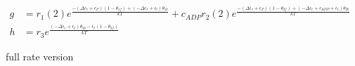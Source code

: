 \documentclass[11pt]{article}
\begin{document}
\begin{figure}[H]
\begin{align}
		g & = r_{1}(2) e^{\frac{ - \left( \Delta\epsilon_{r} + {\epsilon}_P \right) \left( 1 - \theta_{1f} \right) + \left(  - \Delta\epsilon_{r} + \epsilon_{t} \right) \theta_{1b}}{kT}} + c_{ADP} r_{2}(2) e^{\frac{ - \left( \Delta\epsilon_{r} + {\epsilon}_P \right) \left( 1 - \theta_{2f} \right) + \left(  - \Delta\epsilon_{r} + {\epsilon}_{ADP} + \epsilon_{t} \right) \theta_{2b}}{kT}}   \\
		h & = r_3 e^{\frac{\left(  - \Delta\epsilon_{r} + \epsilon_{t} \right) \theta_{3b} - \epsilon_{t} \left( 1 - \theta_{3f} \right)}{kT}}
	\end{align}
	\caption{full rate version}\label{fig:fullrates}
\end{figure}
\end{document}
